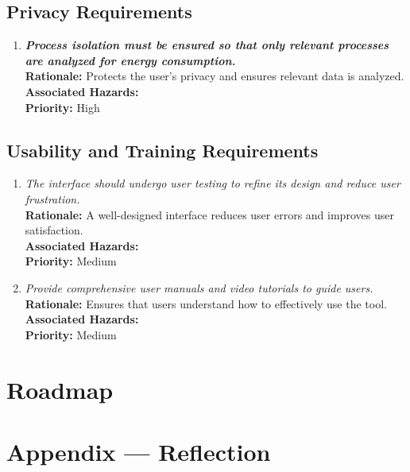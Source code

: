 \documentclass{article}
\begin{document}
\subsection{Privacy Requirements}
\begin{enumerate}[label=SR-PR \arabic*., wide=0pt, leftmargin=*]
    \item \emph{\textbf{Process isolation must be ensured so that only relevant processes are analyzed for energy consumption.}}\\[2mm]
    {\bf Rationale:} Protects the user's privacy and ensures relevant data is analyzed.\\
    {\bf Associated Hazards:} \\
    {\bf Priority:} High
\end{enumerate}

\subsection{Usability and Training Requirements}
\begin{enumerate}[label=SR-UT \arabic*., wide=0pt, leftmargin=*]
    \item \emph{The interface should undergo user testing to refine its design and reduce user frustration.}\\[2mm]
    {\bf Rationale:} A well-designed interface reduces user errors and improves user satisfaction.\\
    {\bf Associated Hazards:} \\
    {\bf Priority:} Medium
    \item \emph{Provide comprehensive user manuals and video tutorials to guide users.}\\[2mm]
    {\bf Rationale:} Ensures that users understand how to effectively use the tool.\\
    {\bf Associated Hazards:} \\
    {\bf Priority:} Medium
\end{enumerate}

\section{Roadmap}


\newpage{}

\section*{Appendix --- Reflection}
\end{document}
